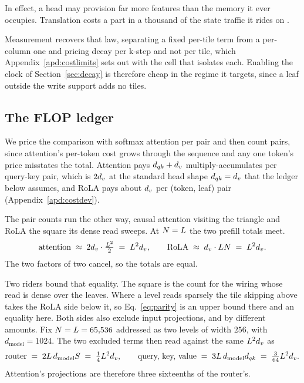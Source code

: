 In effect, a head may provision far more features than the memory it ever occupies. Translation costs a part in a thousand of the state traffic it rides on .

Measurement recovers that law, separating a fixed per-tile term from a per-column one and pricing decay per k-step and not per tile, which Appendix~\ref{apd:costlimits} sets out with the cell that isolates each. Enabling the clock of Section~\ref{sec:decay} is therefore cheap in the regime it targets, since a leaf outside the write support adds no tiles.

\subsection{The FLOP ledger}
\label{sec:ledger}

We price the comparison with softmax attention per pair and then count pairs, since attention's per-token cost grows through the sequence and any one token's price misstates the total. Attention pays $d_{qk} + d_v$ multiply-accumulates per query-key pair, which is $2d_v$ at the standard head shape $d_{qk} = d_v$ that the ledger below assumes, and RoLA pays about $d_v$ per (token, leaf) pair (Appendix~\ref{apd:costdev}).

The pair counts run the other way, causal attention visiting the triangle and RoLA the square its dense read sweeps. At $N = L$ the two prefill totals meet.
\begin{align}
  \text{attention} \;\approx\; 2d_v \cdot \tfrac{L^2}{2} \;=\; L^2 d_v,
  \qquad
  \text{RoLA} \;\approx\; d_v \cdot LN \;=\; L^2 d_v .
  \label{eq:parity}
\end{align}
The two factors of two cancel, so the totals are equal.

Two riders bound that equality. The square is the count for the wiring whose read is dense over the leaves. Where a level reads sparsely the tile skipping above takes the RoLA side below it, so Eq.~\eqref{eq:parity} is an upper bound there and an equality here. Both sides also exclude input projections, and by different amounts. Fix $N = L = 65{,}536$ addressed as two levels of width $256$, with $d_{\mathrm{model}} = 1024$. The two excluded terms then read against the same $L^2 d_v$ as
\begin{align}
  \text{router} \;=\; 2 L\, d_{\mathrm{model}} S \;=\; \tfrac{1}{4} L^2 d_v,
  \qquad
  \text{query, key, value} \;=\; 3 L\, d_{\mathrm{model}} d_{qk} \;=\; \tfrac{3}{64} L^2 d_v .
\end{align}
Attention's projections are therefore three sixteenths of the router's.

